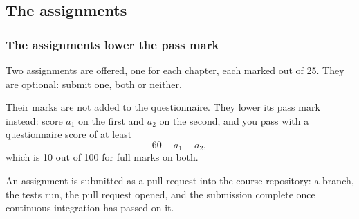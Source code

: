 
\subsection{The assignments}

\begin{frame}
  \frametitle{The assignments lower the pass mark}
Two assignments are offered, one for each chapter, each marked out of 25.
They are optional: submit one, both or neither.

\pause

Their marks are not added to the questionnaire.
They lower its pass mark instead:
score $a_1$ on the first and $a_2$ on the second,
and you pass with a questionnaire score of at least
\[
60 - a_1 - a_2 ,
\]
which is 10 out of 100 for full marks on both.

\pause

An assignment is submitted as a pull request into the course repository:
a branch, the tests run, the pull request opened,
and the submission complete once continuous integration has passed on it.
\end{frame}
